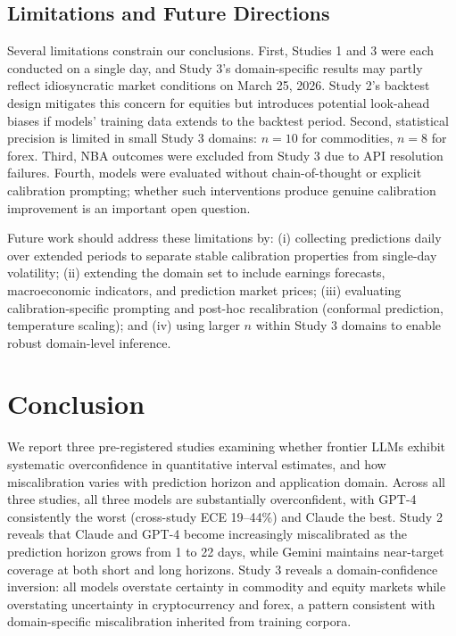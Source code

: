 \subsection{Limitations and Future Directions}
\label{sec:discussion-limitations}

Several limitations constrain our conclusions. First, Studies 1 and 3 were each
conducted on a single day, and Study 3's domain-specific results may partly reflect
idiosyncratic market conditions on March 25, 2026. Study 2's backtest design mitigates
this concern for equities but introduces potential look-ahead biases if models' training
data extends to the backtest period. Second, statistical precision is limited in small
Study 3 domains: $n = 10$ for commodities, $n = 8$ for forex. Third, NBA outcomes were
excluded from Study 3 due to API resolution failures. Fourth, models were evaluated
without chain-of-thought or explicit calibration prompting; whether such interventions
produce genuine calibration improvement is an important open question.

Future work should address these limitations by: (i) collecting predictions daily over
extended periods to separate stable calibration properties from single-day volatility;
(ii) extending the domain set to include earnings forecasts, macroeconomic indicators,
and prediction market prices; (iii) evaluating calibration-specific prompting and
post-hoc recalibration (conformal prediction, temperature scaling); and (iv) using
larger $n$ within Study 3 domains to enable robust domain-level inference.


\section{Conclusion}
\label{sec:conclusion}

We report three pre-registered studies examining whether frontier LLMs exhibit
systematic overconfidence in quantitative interval estimates, and how miscalibration
varies with prediction horizon and application domain. Across all three studies, all
three models are substantially overconfident, with GPT-4 consistently the worst
(cross-study ECE 19--44\%) and Claude the best. Study 2 reveals that Claude and GPT-4
become increasingly miscalibrated as the prediction horizon grows from 1 to 22 days,
while Gemini maintains near-target coverage at both short and long horizons. Study 3
reveals a domain-confidence inversion: all models overstate certainty in commodity and
equity markets while overstating uncertainty in cryptocurrency and forex, a pattern
consistent with domain-specific miscalibration inherited from training corpora.

